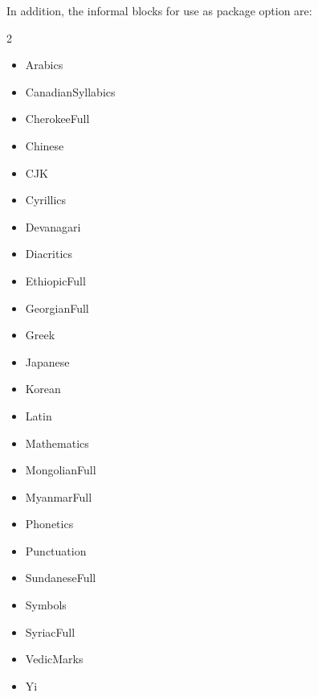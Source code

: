 \documentclass{article}
\newenvironment{itemlist}{%
  \begin{itemize}
  \setlength{\itemsep}{0pt}
  \setlength{\parsep}{0pt}
  \setlength{\topsep}{0pt}
  \setlength{\partopsep}{0pt}
  \setlength{\parskip}{0pt}
  \setlength{\labelsep}{5pt}}%
{
  \end{itemize}}
\begin{document}
    In addition, the informal blocks for use as package option are:

    \begin{multicols*}{2}
      \begin{itemlist}
        \item Arabics
        \item CanadianSyllabics
        \item CherokeeFull
        \item Chinese
        \item CJK
        \item Cyrillics
        \item Devanagari
        \item Diacritics
        \item EthiopicFull
        \item GeorgianFull
        \item Greek
        \item Japanese
        \item Korean
        \item Latin
        \item Mathematics
        \item MongolianFull
        \item MyanmarFull
        \item Phonetics
        \item Punctuation
        \item SundaneseFull
        \item Symbols
        \item SyriacFull
        \item VedicMarks
        \item Yi
      \end{itemlist}
    \end{multicols*}
\end{document}
